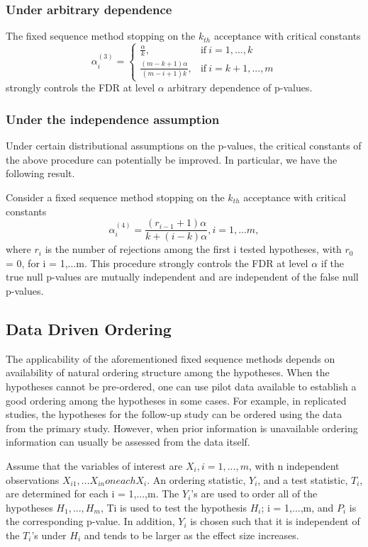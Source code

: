 \documentclass{article}
\begin{document}
\subsubsection{Under arbitrary dependence}
The fixed sequence method stopping on the $k_{th}$ acceptance with critical constants
$$ \alpha_i^{(3)} = \begin{cases}
                    \frac{\alpha}{k}, & \text{if}\ i = 1,...,k \\
                    \frac{(m-k+1)\alpha}{(m-i+1)k}, &  \text{if}\ i = k+1,...,m
                    \end{cases} $$
 strongly controls the FDR at level $\alpha$ arbitrary dependence of p-values. 
 
\subsubsection{Under the independence assumption}
Under certain distributional assumptions on the p-values, the critical constants of the above procedure can potentially be
improved. In particular, we have the following result.

Consider a fixed sequence method stopping on the $k_{th}$ acceptance with critical constants
$$ \alpha_i^{(4)} = \frac{(r_{i-1}+1)\alpha}{k+(i-k)\alpha} , i = 1,...m, $$ where $r_i$ is the number of rejections among the first i tested hypotheses, with $r_0$ = 0, for i = 1,...m. 
This procedure strongly controls the FDR at level $\alpha$ if the true null p-values are mutually independent and are independent of the false null p-values.

\subsection{Data Driven Ordering}
The applicability of the aforementioned fixed sequence methods depends on availability of natural ordering structure among the hypotheses. When the hypotheses cannot be pre-ordered, one can use pilot data available to establish a good ordering among the hypotheses in some cases. For example, in replicated studies, the hypotheses for the follow-up study can be ordered using the data from the primary study. However, when prior information is unavailable ordering information can usually be assessed from the data itself. 

Assume that the variables of interest are $X_i, i = 1,...,m$, with n independent observations $X_{i1},...X_{in} on each X_i$. An ordering statistic, $Y_i$, and a test statistic, $T_i$, are determined for each i = 1,...,m. The $Y_i$'s are used to order all of the hypotheses $H_1,...,H_m$, Ti is used to test the hypothesis $H_i$; i = 1,...,m, and $P_i$ is the corresponding p-value. In addition, $Y_i$ is chosen such that it is independent of the $T_i$'s under $H_i$ and tends to be larger as the effect size increases. 
\end{document}
